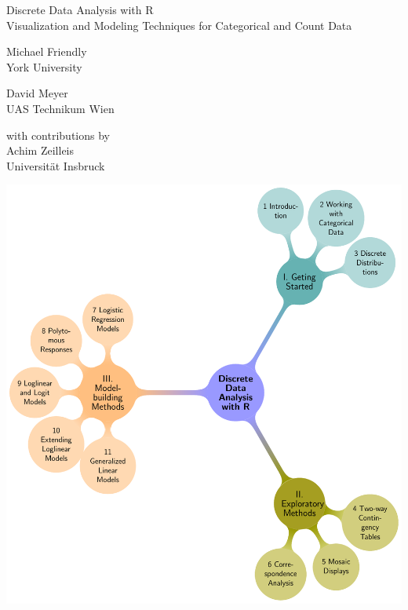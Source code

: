 \setcounter{page}{1}
\bigskip
\begin{center}
\sffamily
\Huge{Discrete Data Analysis with R} \\
\LARGE{Visualization and Modeling Techniques for Categorical and Count Data}
\end{center}
\bigskip
\bigskip

  \begin{minipage}[c]{.5\textwidth}
  	\begin{center}
   	{\Large Michael Friendly} \\ York University
   	\end{center}
   \end{minipage}%
  \hfill
  \begin{minipage}[c]{.5\textwidth}
		\begin{center}  
		{\Large David Meyer} \\ UAS Technikum Wien
   	\end{center}
  \end{minipage}

\bigskip
\begin{center}
with contributions by \\ {\Large Achim Zeilleis} \\ Universit\"at Insbruck
\end{center}

\bigskip
\bigskip
\bigskip
\begin{center}
	\includegraphics[width=.95\textwidth]{front/fig/tocmap}
\end{center}


